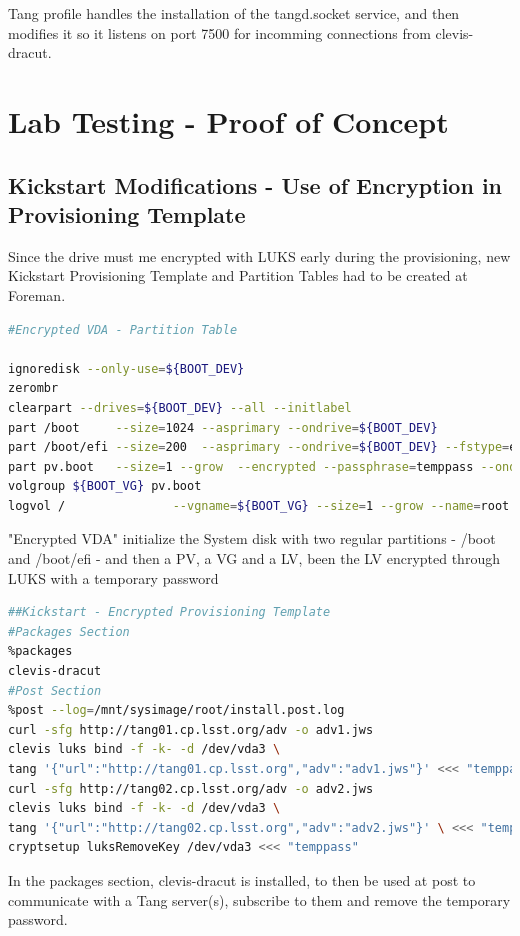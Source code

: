 Tang profile handles the installation of the tangd.socket service, and then modifies it so it listens on port 7500 for incomming connections from clevis-dracut.

\newpage
\section{Lab Testing - Proof of Concept}
\subsection{Kickstart Modifications - Use of Encryption in Provisioning Template}
Since the drive must me encrypted with LUKS early during the provisioning, new Kickstart Provisioning Template and Partition Tables had to be created at Foreman.

\vskip 0.5cm
\begin{lstlisting}[language=bash]
#Encrypted VDA - Partition Table

ignoredisk --only-use=${BOOT_DEV}
zerombr
clearpart --drives=${BOOT_DEV} --all --initlabel
part /boot     --size=1024 --asprimary --ondrive=${BOOT_DEV}
part /boot/efi --size=200  --asprimary --ondrive=${BOOT_DEV} --fstype=efi
part pv.boot   --size=1 --grow  --encrypted --passphrase=temppass --ondisk=${BOOT_DEV}
volgroup ${BOOT_VG} pv.boot
logvol /               --vgname=${BOOT_VG} --size=1 --grow --name=root
\end{lstlisting}

"Encrypted VDA" initialize the System disk with two regular partitions - /boot and /boot/efi - and then a PV, a VG and a LV, been the LV encrypted through LUKS with a temporary password
\begin{lstlisting}[language=bash]
##Kickstart - Encrypted Provisioning Template
#Packages Section
%packages
clevis-dracut
#Post Section
%post --log=/mnt/sysimage/root/install.post.log
curl -sfg http://tang01.cp.lsst.org/adv -o adv1.jws
clevis luks bind -f -k- -d /dev/vda3 \
tang '{"url":"http://tang01.cp.lsst.org","adv":"adv1.jws"}' <<< "temppass"
curl -sfg http://tang02.cp.lsst.org/adv -o adv2.jws
clevis luks bind -f -k- -d /dev/vda3 \
tang '{"url":"http://tang02.cp.lsst.org","adv":"adv2.jws"}' \ <<< "temppass"
cryptsetup luksRemoveKey /dev/vda3 <<< "temppass"
\end{lstlisting}

In the packages section, clevis-dracut is installed, to then be used at post to communicate with a Tang server(s), subscribe to them and remove the temporary password.

